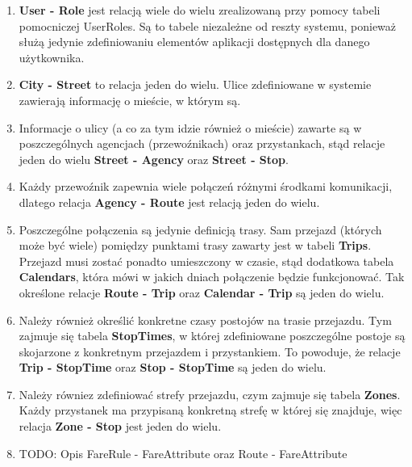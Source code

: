\documentclass[10pt,a4paper]{article}
\begin{document}
\begin{enumerate}
	\item \textbf{User - Role} jest relacją wiele do wielu zrealizowaną przy pomocy tabeli pomocniczej UserRoles. Są to tabele niezależne od reszty systemu, ponieważ służą jedynie zdefiniowaniu elementów aplikacji dostępnych dla danego użytkownika.
	\item \textbf{City - Street} to relacja jeden do wielu. Ulice zdefiniowane w systemie zawierają informację o mieście, w którym są.
	\item Informacje o ulicy (a co za tym idzie również o mieście) zawarte są w poszczególnych agencjach (przewoźnikach) oraz przystankach, stąd relacje jeden do wielu \textbf{Street - Agency} oraz \textbf{Street - Stop}.
	\item Każdy przewoźnik zapewnia wiele połączeń różnymi środkami komunikacji, dlatego relacja \textbf{Agency - Route} jest relacją jeden do wielu.
	\item Poszczególne połączenia są jedynie definicją trasy. Sam przejazd (których może być wiele) pomiędzy punktami trasy zawarty jest w tabeli \textbf{Trips}. Przejazd musi zostać ponadto umieszczony w czasie, stąd dodatkowa tabela \textbf{Calendars}, która mówi w jakich dniach połączenie będzie funkcjonować. Tak określone relacje \textbf{Route - Trip} oraz \textbf{Calendar - Trip} są jeden do wielu.
	\item Należy również określić konkretne czasy postojów na trasie przejazdu. Tym zajmuje się tabela \textbf{StopTimes}, w której zdefiniowane poszczególne postoje są skojarzone z konkretnym przejazdem i przystankiem. To powoduje, że relacje \textbf{Trip - StopTime} oraz \textbf{Stop - StopTime} są jeden do wielu.
	\item Należy równiez zdefiniować strefy przejazdu, czym zajmuje się tabela \textbf{Zones}. Każdy przystanek ma przypisaną konkretną strefę w której się znajduje, więc relacja \textbf{Zone - Stop} jest jeden do wielu.
	\item TODO: Opis FareRule - FareAttribute oraz Route - FareAttribute
\end{enumerate}
\end{document}
